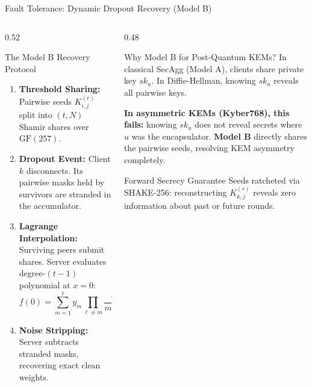 \documentclass[aspectratio=169,10pt]{beamer}
\begin{document}
\begin{frame}{Fault Tolerance: Dynamic Dropout Recovery (Model B)}
  \begin{columns}[T]
    \begin{column}{0.52\textwidth}
      \begin{block}{The Model B Recovery Protocol}
        \small
        \begin{enumerate}[itemsep=2pt]
          \item \textbf{Threshold Sharing:} Pairwise seeds $K_{i,j}^{(r)}$ split into $(t, N)$ Shamir shares over $\text{GF}(257)$.
          \item \textbf{Dropout Event:} Client $k$ disconnects. Its pairwise masks held by survivors are stranded in the accumulator.
          \item \textbf{Lagrange Interpolation:} Surviving peers submit shares. Server evaluates degree-$(t-1)$ polynomial at $x=0$:
          \begin{equation*}
            f(0) = \sum_{m=1}^t y_m \prod_{\ell \ne m} \frac{-\ell}{m - \ell} \pmod{257}
          \end{equation*}
          \item \textbf{Noise Stripping:} Server subtracts stranded masks, recovering exact clean weights.
        \end{enumerate}
      \end{block}
    \end{column}
    \begin{column}{0.48\textwidth}
      \begin{block}{Why Model B for Post-Quantum KEMs?}
        \footnotesize
        In classical SecAgg (Model A), clients share private key $sk_u$. In Diffie-Hellman, knowing $sk_u$ reveals all pairwise keys.
        
        \textbf{In asymmetric KEMs (Kyber768), this fails:} knowing $sk_u$ does not reveal secrets where $u$ was the encapsulator. \textbf{Model B} directly shares the pairwise seeds, resolving KEM asymmetry completely.
      \end{block}
      \begin{block}{Forward Secrecy Guarantee}
        \footnotesize
        Seeds ratcheted via SHAKE-256: reconstructing $K_{k,j}^{(r)}$ reveals zero information about past or future rounds.
      \end{block}
    \end{column}
  \end{columns}
\end{frame}
\end{document}
